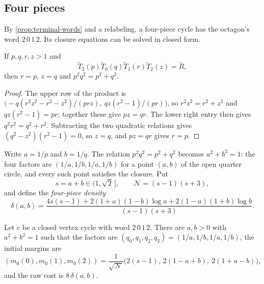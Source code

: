 \subsection{Four pieces}\label{sec:terminal-four}

By \cref{prop:terminal-words} and a relabeling, a four-piece cycle has the octagon's word
$2\,0\,1\,2$. Its closure equations can be solved in closed form.

\begin{lemma}\label{lem:four-closure}
If $p,q,r,z>1$ and
\[\widetilde T_2(p)\widetilde T_0(q)\widetilde T_1(r)\widetilde T_2(z)=\widetilde R,\]
then $r=p$,
$z=q$ and $p^2q^2=p^2+q^2$.
\end{lemma}

\begin{proof}
The upper row of the product is
$\bigl(-q(r^2z^2-r^2-z^2)/(prz),\ qz(r^2-1)/(pr)\bigr)$, so $r^2z^2=r^2+z^2$ and
$qz(r^2-1)=pr$; together these give $pz=qr$. The lower right entry then gives
$q^2r^2=q^2+r^2$. Subtracting the two quadratic relations gives $(q^2-z^2)(r^2-1)=0$, so $z=q$,
and $pz=qr$ gives $r=p$.
\end{proof}

Write $a=1/p$ and $b=1/q$. The relation $p^2q^2=p^2+q^2$ becomes $a^2+b^2=1$: the four factors
are $(1/a,1/b,1/a,1/b)$ for a point $(a,b)$ of the open quarter circle, and every such point
satisfies the closure. Put
\[
 s=a+b\in(1,\sqrt2\,],\qquad \mathcal N=(s-1)(s+3),
\]
and define the \emph{four-piece density}
\begin{equation}\label{eq:four-density}
 \delta(a,b)=\frac{4s(s-1)+2(1+a)(1-b)\log a+2(1-a)(1+b)\log b}{(s-1)(s+3)}.
\end{equation}

\begin{lemma}\label{lem:four-param}
Let $c$ be a closed vertex cycle with word $2\,0\,1\,2$. There are $a,b>0$ with $a^2+b^2=1$
such that the factors are $(q_0,q_1,q_2,q_3)=(1/a,1/b,1/a,1/b)$, the initial margins are
\begin{equation}\label{eq:four-margins}
 (m_0(0),m_0(1),m_0(2))=\frac{1}{\sqrt{\mathcal N}}\bigl(2(s-1),\ 2(1-a+b),\ 2(1+a-b)\bigr),
\end{equation}
and the raw cost is $8\,\delta(a,b)$.
\end{lemma}

